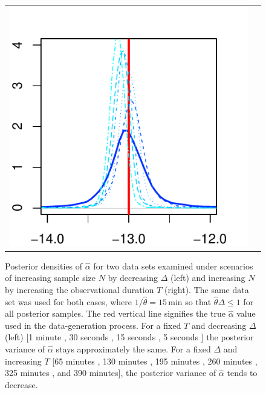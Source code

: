\documentclass[10pt]{article}
\newcommand{\htheta}{\hat{\theta}}
\newcommand{\halpha}{\hat{\alpha}}
\begin{document}
\begin{figure}[h!]
\begin{tabular}{cc}
\begin{minipage}{0.45\textwidth}
				\includegraphics[width=1\linewidth]{alphas-increasing-T.pdf}
				\end{minipage}
\end{tabular}
\caption{Posterior densities of $\halpha$ for two data sets examined under scenarios of increasing sample size $N$ by decreasing $\Delta$ (left) and increasing $N$ by increasing the observational duration $T$ (right). The same data set was used for both cases, where $1/\htheta = 15\, \mbox{min}$ so that $\htheta \Delta \leq 1$ for all posterior samples. The red vertical line signifies the true $\halpha$ value used in the data-generation process. For a fixed $T$ and decreasing $\Delta$ (left) [1 minute \usebox{\legendLineOne}, 30 seconds \usebox{\legendLineTwo}, 15 seconds \usebox{\legendLineThree}, 5 seconds \usebox{\legendLineFour}] the posterior variance of $\halpha$ stays approximately the same. For a fixed $\Delta$ and increasing $T$ [65 minutes \usebox{\legendLineOne}, 130 minutes \usebox{\legendLineTwo}, 195 minutes \usebox{\legendLineThree}, 260 minutes \usebox{\legendLineFour}, 325 minutes \usebox{\legendLineFive}, and 390 \usebox{\legendLineTwo} minutes], the posterior variance of $\halpha$ tends to decrease.}\label{fig:different-phi}
\end{figure}
\end{document}
